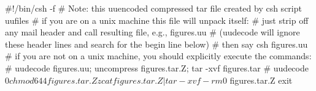 \vfill\eject



#!/bin/csh -f
# Note: this uuencoded compressed tar file created by csh script  uufiles
# if you are on a unix machine this file will unpack itself:
# just strip off any mail header and call resulting file, e.g., figures.uu
# (uudecode will ignore these header lines and search for the begin line below)
# then say        csh figures.uu
# if you are not on a unix machine, you should explicitly execute the commands:
#    uudecode figures.uu;   uncompress figures.tar.Z;   tar -xvf figures.tar
#
uudecode $0
chmod 644 figures.tar.Z
zcat figures.tar.Z | tar -xvf -
rm $0 figures.tar.Z
exit

